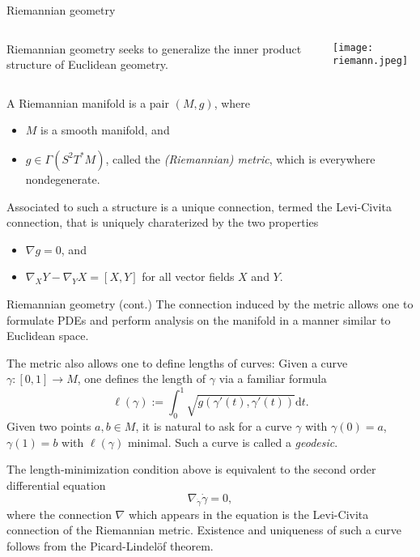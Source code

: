 \documentclass[handout]{beamer}
\begin{document}
\begin{frame}{Riemannian geometry}
  \begin{columns}
    \begin{column}{0.7 \textwidth}
      Riemannian geometry seeks to generalize the inner product structure of Euclidean geometry.
    \end{column}
    \begin{column}{0.3 \textwidth}
      \begin{center}
        \texttt{[image: riemann.jpeg]}
      \end{center}
    \end{column}
  \end{columns}
    \begin{definition}
      A Riemannian manifold is a pair $(M,g)$, where 
      \begin{itemize}
        \item $M$ is a smooth manifold, and 
        \item $g\in \Gamma(S^2 T^* M)$, called the \emph{(Riemannian) metric}, which is everywhere nondegenerate.
      \end{itemize}
    \end{definition}
  Associated to such a structure is a unique connection, termed the Levi-Civita connection, that is uniquely charaterized by the two properties
  \begin{itemize}
    \item $\nabla g = 0$, and 
    \item $\nabla_X Y - \nabla_Y X = [X,Y]$ for all vector fields $X$ and $Y$.
  \end{itemize}
\end{frame}

\begin{frame}{Riemannian geometry (cont.)}
  The connection induced by the metric allows one to formulate PDEs and perform analysis on the manifold in a manner similar to Euclidean space.

  The metric also allows one to define lengths of curves:
  Given a curve $\gamma : [0,1] \to M$, one defines the length of $\gamma$ via a familiar formula 
  \[
    \ell(\gamma) := \int_0 ^1 \sqrt{g(\gamma'(t), \gamma'(t))} \text{d} t.
  \]
  Given two points $a,b \in M$, it is natural to ask for a curve $\gamma$ with $\gamma(0)=a$, $\gamma(1)=b$ with $\ell(\gamma)$ minimal.
  Such a curve is called a \emph{geodesic}.

  The length-minimization condition above is equivalent to the second order differential equation 
  \[
    \nabla_{\dot{\gamma}} \dot{\gamma} = 0,
  \]
  where the connection $\nabla$ which appears in the equation is the Levi-Civita connection of the Riemannian metric.
  Existence and uniqueness of such a curve follows from the Picard-Lindel\"{o}f theorem.
\end{frame}
\end{document}
